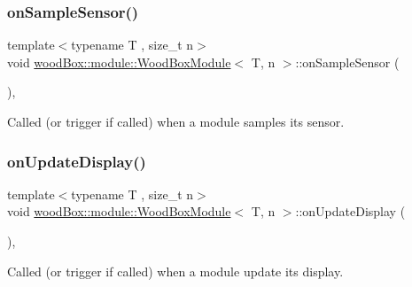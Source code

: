 \subsubsection{\texorpdfstring{on\+Sample\+Sensor()}{onSampleSensor()}}
{\footnotesize\ttfamily template$<$typename T , size\+\_\+t n$>$ \\
void \mbox{\hyperlink{classwood_box_1_1module_1_1_wood_box_module}{wood\+Box\+::module\+::\+Wood\+Box\+Module}}$<$ T, n $>$\+::on\+Sample\+Sensor (\begin{DoxyParamCaption}{ }\end{DoxyParamCaption})\hspace{0.3cm}{\ttfamily [inline]}, {\ttfamily [protected]}}

Called (or trigger if called) when a module samples its sensor. \mbox{\label{classwood_box_1_1module_1_1_wood_box_module_a1461bd1a53529065541c87fc03a28f57}} 
\subsubsection{\texorpdfstring{on\+Update\+Display()}{onUpdateDisplay()}}
{\footnotesize\ttfamily template$<$typename T , size\+\_\+t n$>$ \\
void \mbox{\hyperlink{classwood_box_1_1module_1_1_wood_box_module}{wood\+Box\+::module\+::\+Wood\+Box\+Module}}$<$ T, n $>$\+::on\+Update\+Display (\begin{DoxyParamCaption}{ }\end{DoxyParamCaption})\hspace{0.3cm}{\ttfamily [inline]}, {\ttfamily [protected]}}

Called (or trigger if called) when a module update its display. \mbox{\label{classwood_box_1_1module_1_1_wood_box_module_acdae18f8e9e685cdbce5a4fc99956ab3}} 
